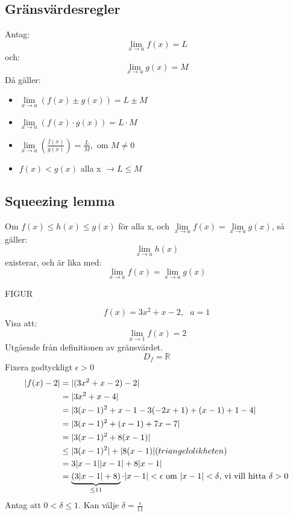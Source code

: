 \subsection{Gränsvärdesregler} %
\label{sub:gr_nsv_rdesregler}
Antag:
\[
\lim\limits_{x \to a}f(x) = L
\]
och:
\[
\lim\limits_{x \to a}g(x) = M
\]
Då gäller:
\begin{itemize}
	\item $\lim\limits_{x \to a}(f(x) \pm g(x)) = L \pm M$
	\item $\lim\limits_{x \to a}(f(x) \cdot g(x)) = L \cdot M$
	\item $\lim\limits_{x \to a}(\frac{f(x)}{g(x)}) = \frac{L}{M}, \mbox{ om }M \neq 0$
	\item $f(x) < g(x)$ alla x $\rightarrow L \le M$
\end{itemize}

\subsection{Squeezing lemma} %
\label{sub:squeesing_lemma}

Om $f(x) \le h(x) \le g(x)$ för alla x, och $\lim\limits_{x \to a}f(x) = \lim\limits_{x \to a}g(x)$, så gäller:
\[
\lim\limits_{x \to a}h(x)
\]
existerar, och är lika med:
\[
\lim\limits_{x \to a}f(x) = \lim\limits_{x \to a}g(x)
\]
\begin{center}
	FIGUR
\end{center}
\begin{Ex}
    \[
    f(x) = 3x^2 + x - 2, \mbox{ } a = 1
    \]
    Visa att:
    \[
    \lim\limits_{x \to 1}f(x) = 2
    \]
    Utgående från definitionen av gränsvärdet.
    \[
    D_f = \mathbb{R}
    \]
    Fixera godtyckligt $\epsilon > 0$ 
    \begin{align*}
    	\lvert f(x)-2\rvert &= \lvert(3x^2 + x -2) -2\rvert \\
    	&= \lvert3x^2 + x - 4\rvert \\
    	&= \lvert3(x-1)^2 + x -1 -3(-2x + 1) + (x-1) + 1 - 4\rvert\\
    	&= \lvert3(x-1)^2 + (x-1) + 7x -7\rvert \\
    	&= \lvert3(x-1)^2 + 8(x - 1)\rvert \\
    	&\le \lvert3(x-1)^2\rvert + \lvert8(x-1)\rvert (triangelolikheten)\\
    	&= 3 \lvert x-1\rvert \lvert x-1\rvert + 8 \lvert x-1\rvert\\
    	&= \underbrace{(3 \lvert x-1\rvert + 8)}_{\le 11} \cdot \lvert x-1\rvert < \epsilon \mbox{ om $\lvert x-1\rvert < \delta$, vi vill hitta $\delta > 0$}	
    \end{align*}
    Antag att $0 < \delta \le 1$. Kan välje $\delta = \frac{\epsilon}{11}$
\end{Ex}


























